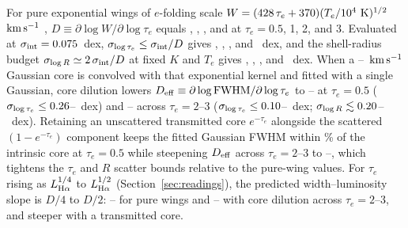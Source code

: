 \documentclass[twocolumn,linenumbers]{aastex701}
\newcommand{\kms}{\ensuremath{{\rm km\,s^{-1}}}}
\newcommand{\sigint}{\sigma_{\rm int}}
\newcommand{\LHa}{L_{\rm H\alpha}}
\begin{document}
For pure exponential wings of $e$-folding scale $W=(428{}\,\tau_e+370{})(T_e/10^{4}~{\rm K})^{1/2}$~\kms{} \citep{Rusakov2026}, $D\equiv\partial\log W/\partial\log\tau_e$ equals \DHalf{}, \DOne{}, \DTwo{}, and \DThree{} at $\tau_e=0.5$, 1, 2, and 3.
Evaluated at $\sigint=\FsigUp{}$~dex, $\sigma_{\log\tau_e}\leq\sigint/D$ gives \sigTauHalf{}, \sigTauOne{}, \sigTauTwo{}, and \sigTauThree{}~dex, and the shell-radius budget $\sigma_{\log R}\simeq2\,\sigint/D$ at fixed $K$ and $T_e$ gives \sigRHalf{}, \sigROne{}, \sigRTwo{}, and \sigRThree{}~dex.
When a \coreLo{}--\coreHi{}~\kms{} Gaussian core is convolved with that exponential kernel and fitted with a single Gaussian, core dilution lowers $D_{\rm eff}\equiv\partial\log{\rm FWHM}/\partial\log\tau_e$ to \DconvHalfLo{}--\DconvHalfHi{} at $\tau_e=0.5$ ($\sigma_{\log\tau_e}\leq0.26{}$--\sigTauConvHalfHi{}~dex) and \DconvHiLo{}--\DconvHiHi{} across $\tau_e=2$--3 ($\sigma_{\log\tau_e}\leq0.10{}$--\sigTauConvHiHi{}~dex; $\sigma_{\log R}\lesssim0.20{}$--\sigRConvHiHi{}~dex).
Retaining an unscattered transmitted core $e^{-\tau_e}$ alongside the scattered $(1-e^{-\tau_e})$ component keeps the fitted Gaussian FWHM within \rtHalfBoostMax{}\% of the intrinsic core at $\tau_e=0.5$ while steepening $D_{\rm eff}$ across $\tau_e=2$--3 to \DrtHiLo{}--\DrtHiHi{}, which tightens the $\tau_e$ and $R$ scatter bounds relative to the pure-wing values.
For $\tau_e$ rising as $\LHa^{1/4}$ to $\LHa^{1/2}$ (Section~\ref{sec:readings}), the predicted width--luminosity slope is $D/4$ to $D/2$: \shellPureLo{}--\shellSlopeHi{} for pure wings and \shellSlopeLo{}--\shellConvHi{} with core dilution across $\tau_e=2$--3, and steeper with a transmitted core.



\end{document}
